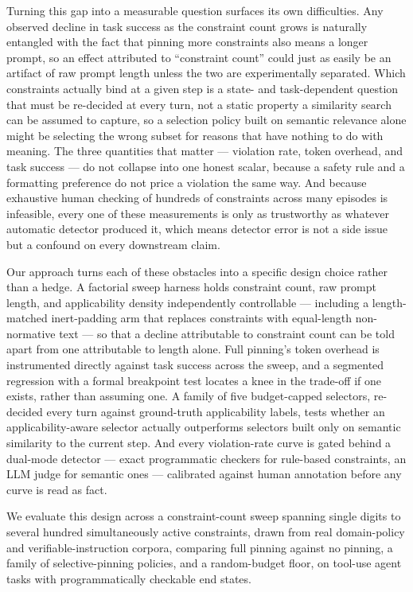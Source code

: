 \documentclass[11pt]{article}
\begin{document}
Turning this gap into a measurable question surfaces its own difficulties. Any observed decline in task success as the constraint count grows is naturally entangled with the fact that pinning more constraints also means a longer prompt, so an effect attributed to ``constraint count'' could just as easily be an artifact of raw prompt length unless the two are experimentally separated. Which constraints actually bind at a given step is a state- and task-dependent question that must be re-decided at every turn, not a static property a similarity search can be assumed to capture, so a selection policy built on semantic relevance alone might be selecting the wrong subset for reasons that have nothing to do with meaning. The three quantities that matter --- violation rate, token overhead, and task success --- do not collapse into one honest scalar, because a safety rule and a formatting preference do not price a violation the same way. And because exhaustive human checking of hundreds of constraints across many episodes is infeasible, every one of these measurements is only as trustworthy as whatever automatic detector produced it, which means detector error is not a side issue but a confound on every downstream claim.

Our approach turns each of these obstacles into a specific design choice rather than a hedge. A factorial sweep harness holds constraint count, raw prompt length, and applicability density independently controllable --- including a length-matched inert-padding arm that replaces constraints with equal-length non-normative text --- so that a decline attributable to constraint count can be told apart from one attributable to length alone. Full pinning's token overhead is instrumented directly against task success across the sweep, and a segmented regression with a formal breakpoint test locates a knee in the trade-off if one exists, rather than assuming one. A family of five budget-capped selectors, re-decided every turn against ground-truth applicability labels, tests whether an applicability-aware selector actually outperforms selectors built only on semantic similarity to the current step. And every violation-rate curve is gated behind a dual-mode detector --- exact programmatic checkers for rule-based constraints, an LLM judge for semantic ones --- calibrated against human annotation before any curve is read as fact.

We evaluate this design across a constraint-count sweep spanning single digits to several hundred simultaneously active constraints, drawn from real domain-policy and verifiable-instruction corpora, comparing full pinning against no pinning, a family of selective-pinning policies, and a random-budget floor, on tool-use agent tasks with programmatically checkable end states.
\end{document}
